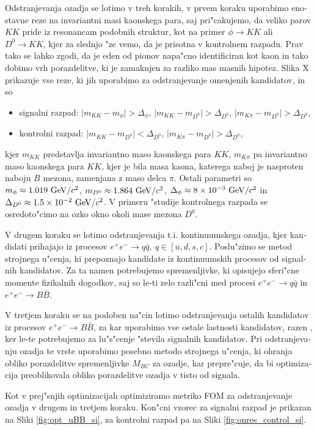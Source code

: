 \begin{otherlanguage}{slovene}
Odstranjevanja ozadja se lotimo v treh korakih, v prvem koraku uporabimo enostavne reze na invariantni masi kaonskega para, saj pri"cakujemo, da veliko parov $KK$ pride iz resonancam podobnih struktur, kot na primer $\phi \to KK$ ali $D^0 \to KK$, kjer za slednjo "ze vemo, da je prisotna v kontrolnem razpadu. Prav tako se lahko zgodi, da je eden od pionov napa"cno identificiran kot kaon in tako dobimo vrh porazdelitve, ki je zamaknjen za razliko mas masnih hipotez. Slika X prikazuje vse reze, ki jih uporabimo za odstranjevanje omenjenih kandidatov, in so
\begin{itemize}
\item signalni razpad: $\vert m_{KK} - m_{\phi} \vert > \Delta_\phi$, $\vert m_{KK} - m_{D^0} \vert > \Delta_{D^0}$, $\vert m_{K\pi} - m_{D^0} \vert > \Delta_{D^0}$,
\item kontrolni razpad: $\vert m_{KK} - m_{D^0} \vert < \Delta_{D^0}$, $\vert m_{K\pi} - m_{D^0} \vert > \Delta_{D^0}$,
\end{itemize}
kjer $m_{KK}$ predstavlja invariantno maso kaonskega para $KK$, $m_{K\pi}$ pa invariantno maso kaonskega para $KK$, kjer je bila masa kaona, katerega naboj je nasproten naboju $B$ mezona, zamenjana z maso delca $\pi$. Ostali parametri so $m_\phi \approx 1.019\mathrm{~GeV}/c^2$, $m_{D^0} \approx 1.864\mathrm{~GeV}/c^2$, $\Delta_\phi \approx 8\times 10^{-3}\mathrm{~GeV}/c^2$ in $\Delta_{D^0} \approx 1.5\times 10^{-2}\mathrm{~GeV}/c^2$. V primeru "studije kontrolnega razpada se osredoto"cimo na ozko okno okoli mase mezona $D^0$. 

V drugem koraku se lotimo odstranjevanja t.i. kontinuumskega ozadja, kjer kandidati prihajajo iz procesov $e^+e^- \to q \bar q,~q\in[u, d, s, c]$. Poslu"zimo se metod strojnega u"cenja, ki prepoznajo kandidate iz kontinuumskih procesov od signalnih kandidatov. Za ta namen potrebujemo spremenljivke, ki opisujejo sferi"cne momente fizikalnih dogodkov, saj so le-ti zelo razli"cni med procesi $e^+e^- \to q \bar q$ in $e^+e^- \to B \bar B$.

V tretjem koraku se na podoben na"cin lotimo odstranjevanja ostalih kandidatov iz procesov $e^+e^- \to B \bar B$, za kar uporabimo vse ostale lastnosti kandidatov, razen \varss, ker le-te potrebujemo za lu"s"cenje "stevila signalnih kandidatov. Pri odstranjevanju ozadja te vrste uporabimo posebno metodo strojnega u"cenja, ki ohranja obliko porazdelitve spremenljivke $M_{BC}$ za ozadje, kar prepre"cuje, da bi optimizacija preoblikovala obliko porazdelitve ozadja v tisto od signala.

Kot v prej"snjih optimizacijah optimiziramo metriko FOM za odstranjevanje ozadja v drugem in tretjem koraku. Kon"cni vzorec za signalni razpad je prikazan na Sliki \ref{fig:opt_uBB_si}, za kontrolni razpad pa na Sliki \ref{fig:onres_control_si}.


\end{otherlanguage}
